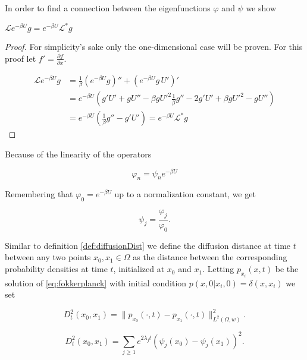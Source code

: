 In order to find a connection between the eigenfunctions $\varphi$ and $\psi$ we show
\begin{lemma}
$\mathcal{L}e^{-\beta U}g = e^{-\beta U}\mathcal{L}^*g$
\end{lemma}

\begin{proof}
For simplicity's sake only the one-dimensional case will be proven. For this proof let $f' = \frac{\partial f}{\partial x}$.

\begin{equation*}\begin{aligned}
\mathcal{L}e^{-\beta U}g &= \frac{1}{\beta}(e^{-\beta U}g)'' + \left(e^{-\beta U}g\,U' \right)'\\
&= e^{-\beta U}\left(g'U'+gU''-\beta gU'^2\frac{1}{\beta}g''-2g'U'+\beta gU'^2-gU'' \right)\\
&= e^{-\beta U}\left(\frac{1}{\beta}g'' - g'U'\right) = e^{-\beta U}\mathcal{L}^*g
\end{aligned}\end{equation*}
\end{proof}

Because of the linearity of the operators

\begin{equation*}
\varphi_n = \psi_n e^{-\beta U}
\end{equation*}

Remembering that $\varphi_0 = e^{-\beta U}$ up to a normalization constant, we get

\begin{equation}\label{eq:connectionBetweenEigenfunctions}
\psi_j = \frac{\varphi_j}{\varphi_0}.
\end{equation}

Similar to definition \ref{def:diffusionDist} we define the diffusion distance at time $t$ between any two points $x_0, x_1 \in \Omega$ as the distance between the corresponding probability densities at time $t$, initialized at $x_0$ and $x_1$. Letting $p_{x_i}(x,t)$ be the solution of \eqref{eq:fokkerplanck} with initial condition $p(x,0 | x_i, 0) = \delta(x,x_i)$ we set

\begin{definition}
\begin{equation*}
D_t^2(x_0,x_1) = \|p_{x_0}(\cdot, t) - p_{x_1}(\cdot, t) \|_{L^2(\Omega, w)}^2.
\end{equation*}
\end{definition}

\begin{lemma}\begin{equation*}
D_t^2(x_0,x_1) = \sum_{j\geq 1} e^{2\lambda_j t} (\psi_j(x_0)-\psi_j(x_1))^2.
\end{equation*}\end{lemma}

